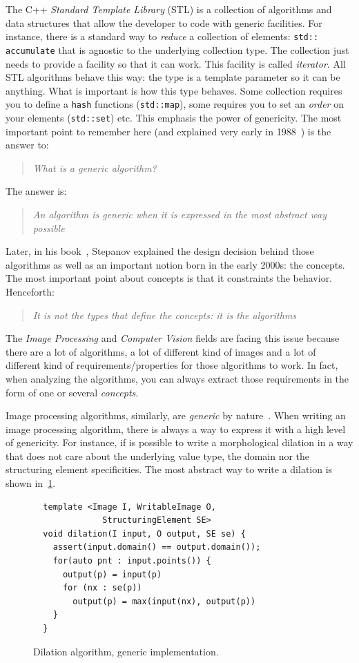 The C++ \emph{Standard Template Library} (STL) is a collection of algorithms and data structures that allow the
developer to code with generic facilities. For instance, there is a standard way to \emph{reduce} a collection of
elements: \texttt{std:: accumulate} that is agnostic to the underlying collection type. The collection just needs to
provide a facility so that it can work. This facility is called \emph{iterator}. All STL algorithms behave this way: the
type is a template parameter so it can be anything. What is important is how this type behaves. Some collection requires
you to define a \texttt{hash} functions (\texttt{std::map}), some requires you to set an \emph{order} on your elements
(\texttt{std::set}) etc. This emphasis the power of genericity. The most important point to remember here (and explained
very early in 1988~\cite{musser.1988.generic}) is the answer to: \blockquote{\emph{What is a generic algorithm?}}. The
answer is: \blockquote{\emph{An algorithm is generic when it is expressed in the most abstract way possible}}. Later, in
his book~\cite{stepanov.2009.elements}, Stepanov explained the design decision behind those algorithms as well as an
important notion born in the early 2000s: the concepts. The most important point about concepts is that it constraints
the behavior. Henceforth: \blockquote{\emph{It is not the types that define the concepts: it is the algorithms}}. The
\emph{Image Processing} and \emph{Computer Vision} fields are facing this issue because there are a lot of algorithms, a
lot of different kind of images and a lot of different kind of requirements/properties for those algorithms to work. In
fact, when analyzing the algorithms, you can always extract those requirements in the form of one or several
\emph{concepts}.

Image processing algorithms, similarly, are \emph{generic} by
nature~\cite{ritter.1990.cvgi,geraud.2000.icpr,darbon.2002.ismm,levillain.2010.icip,levillain.2014.ciarp}. When writing
an image processing algorithm, there is always a way to express it with a high level of genericity. For instance, if is
possible to write a morphological dilation in a way that does not care about the underlying value type, the domain nor
the structuring element specificities. The most abstract way to write a dilation is shown in~\ref{fig.gen.dilate}.

\begin{figure}[tbh]
  \centering
  \begin{verbatim}
  template <Image I, WritableImage O,
              StructuringElement SE>
  void dilation(I input, O output, SE se) {
    assert(input.domain() == output.domain());
    for(auto pnt : input.points()) {
      output(p) = input(p)
      for (nx : se(p))
        output(p) = max(input(nx), output(p))
    }
  }
  \end{verbatim}
  \caption{Dilation algorithm, generic implementation.}
  \label{fig.gen.dilate}
\end{figure}

